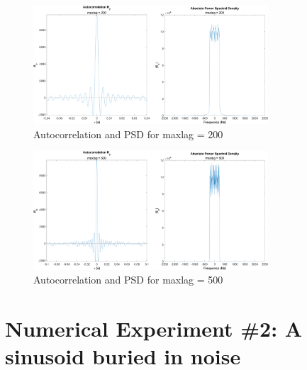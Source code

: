\documentclass[12pt]{article}
\begin{document}
\begin{enumerate}[label=\roman*)]
	\begin{figure}[h]
		\centering
		\includegraphics[width=0.78\textwidth]{exp1_maxlag_200}
		\caption{\label{fig:exp1_maxlag200}Autocorrelation and PSD for maxlag = 200}
	\end{figure}
	
	\begin{figure}[h]
		\centering
		\includegraphics[width=0.78\textwidth]{exp1_maxlag_500}
		\caption{\label{fig:exp1_maxlag500}Autocorrelation and PSD for maxlag = 500}
	\end{figure}

\end{enumerate} \clearpage

\section*{Numerical Experiment \#2: A sinusoid buried in noise}

\end{document}
